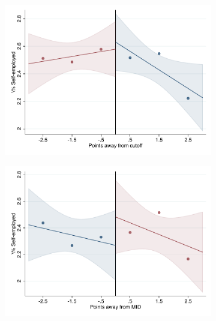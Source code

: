 \documentclass[oneside,11pt]{article}
\begin{document}
\begin{figure}[H]

    \ContinuedFloat
    \caption{(Cont.) RD plots for outcome variables across those assigned to UNAM high-school, and those who are not\label{fig:ITT_rd_plot_UNAM_6}}
    \begin{center}
    
    \begin{subfigure}{0.475\textwidth}
        \centering
        \includegraphics[width=\textwidth]{04_Figures/rd_plot_tau_Selfemployed_UNAM3.pdf}
    \end{subfigure}
    \begin{subfigure}{0.475\textwidth}
        \centering
        \includegraphics[width=\textwidth]{04_Figures/rd_plot_mid_Selfemployed_UNAM3.pdf}
    \end{subfigure}
    \end{center}
    

\end{figure}
\end{document}
